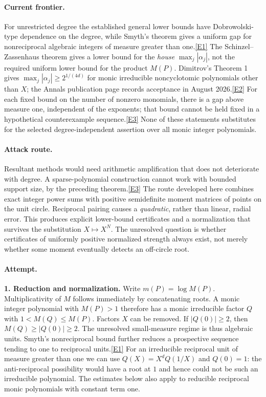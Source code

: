 \documentclass[11pt,a4paper]{article}
\newcommand{\eref}[2]{\hyperlink{extra:#1:#2}{[E#2]}}
\begin{document}
\paragraph{Current frontier.}
For unrestricted degree the established general lower bounds have
Dobrowolski-type dependence on the degree, while Smyth's theorem gives
a uniform gap for nonreciprocal algebraic integers of measure greater than one.\eref{30003556}{1}
The Schinzel--Zassenhaus theorem gives a lower bound for the \emph{house}
$\max_j|\alpha_j|$, not the required uniform lower bound for the product
$M(P)$. Dimitrov's Theorem 1 gives $\max_j|\alpha_j|\ge2^{1/(4d)}$
for monic irreducible noncyclotomic polynomials other than $X$;
the Annals publication page records acceptance in August 2026.\eref{30003556}{2}
For each fixed bound on the number of nonzero monomials, there is a gap
above measure one, independent of the exponents; that bound cannot be
held fixed in a hypothetical counterexample sequence.\eref{30003556}{3}
None of these statements substitutes for the selected degree-independent
assertion over all monic integer polynomials.

\paragraph{Attack route.}
Resultant methods would need arithmetic amplification that does not
deteriorate with degree. A sparse-polynomial construction cannot work
with bounded support size, by the preceding theorem.\eref{30003556}{3}
The route developed here combines exact integer power sums with positive
semidefinite moment matrices of points on the unit circle. Reciprocal
pairing causes a \emph{quadratic}, rather than linear, radial error.
This produces explicit lower-bound certificates and a normalization
that survives the substitution $X\mapsto X^N$. The unresolved question
is whether certificates of uniformly positive normalized strength always
exist, not merely whether some moment eventually detects an off-circle
root.

\paragraph{Attempt.}
\textbf{1. Reduction and normalization.}
Write $m(P)=\log M(P)$. Multiplicativity of $M$ follows immediately by
concatenating roots. A monic integer polynomial with $M(P)>1$ therefore
has a monic irreducible factor $Q$ with $1<M(Q)\le M(P)$. Factors $X$
can be removed. If $|Q(0)|\ge2$, then
$M(Q)\ge|Q(0)|\ge2$. The unresolved small-measure regime is thus
algebraic units. Smyth's nonreciprocal bound further reduces a prospective
sequence tending to one to reciprocal units.\eref{30003556}{1}
For an irreducible reciprocal unit of measure greater than one we can
use $Q(X)=X^dQ(1/X)$ and $Q(0)=1$: the anti-reciprocal possibility
would have a root at $1$ and hence could not be such an irreducible
polynomial. The estimates below also apply to reducible reciprocal
monic polynomials with constant term one.
\end{document}
